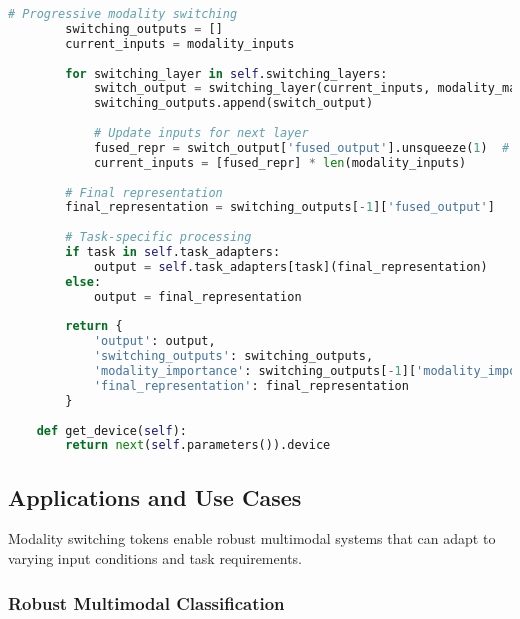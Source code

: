 \begin{lstlisting}[language=Python, caption=Dynamic modality switching architecture]
        # Progressive modality switching
        switching_outputs = []
        current_inputs = modality_inputs
        
        for switching_layer in self.switching_layers:
            switch_output = switching_layer(current_inputs, modality_masks)
            switching_outputs.append(switch_output)
            
            # Update inputs for next layer
            fused_repr = switch_output['fused_output'].unsqueeze(1)  # [B, 1, embed_dim]
            current_inputs = [fused_repr] * len(modality_inputs)
        
        # Final representation
        final_representation = switching_outputs[-1]['fused_output']
        
        # Task-specific processing
        if task in self.task_adapters:
            output = self.task_adapters[task](final_representation)
        else:
            output = final_representation
        
        return {
            'output': output,
            'switching_outputs': switching_outputs,
            'modality_importance': switching_outputs[-1]['modality_importance'],
            'final_representation': final_representation
        }
    
    def get_device(self):
        return next(self.parameters()).device
\end{lstlisting}

\subsection{Applications and Use Cases}

Modality switching tokens enable robust multimodal systems that can adapt to varying input conditions and task requirements.

\subsubsection{Robust Multimodal Classification}

